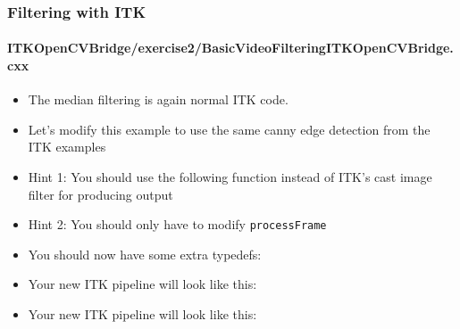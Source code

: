 \begin{frame}
\frametitle{Filtering with ITK}
\framesubtitle{ITKOpenCVBridge/exercise2/BasicVideoFilteringITKOpenCVBridge.cxx}
\begin{itemize}
\item The median filtering is again normal ITK code.
\end{itemize}
\end{frame}

\begin{frame}
\begin{itemize}
\frametitle{Exercise 2}
\framesubtitle{ITKOpenCVBridge/exercise2/BasicVideoFilteringITKOpenCVBridge.cxx}
\item Let's modify this example to use the same canny edge detection
  from the ITK examples
\pause 
\item Hint 1: You should use the following function instead of ITK's
cast image filter for producing output
\pause
\item Hint 2: You should only have to modify {\tt processFrame}
\end{itemize}
\end{frame}

\begin{frame}
\begin{itemize}
\frametitle{Exercise 2: Answer}
\framesubtitle{ITKOpenCVBridge/exercise2/BasicVideoFilteringITKOpenCVBridgeAnswer.cxx}
\item You should now have some extra typedefs:
\end{itemize}
\end{frame}

\begin{frame}
\begin{itemize}
\frametitle{Exercise 2: Answer}
\framesubtitle{ITKOpenCVBridge/exercise2/BasicVideoFilteringITKOpenCVBridgeAnswer.cxx}
\item Your new ITK pipeline will look like this:
\end{itemize}
\end{frame}

\begin{frame}
\begin{itemize}
\frametitle{Exercise 2: Answer}
\framesubtitle{ITKOpenCVBridge/exercise2/BasicVideoFilteringITKOpenCVBridgeAnswer.cxx}
\item Your new ITK pipeline will look like this:
\end{itemize}
\end{frame}